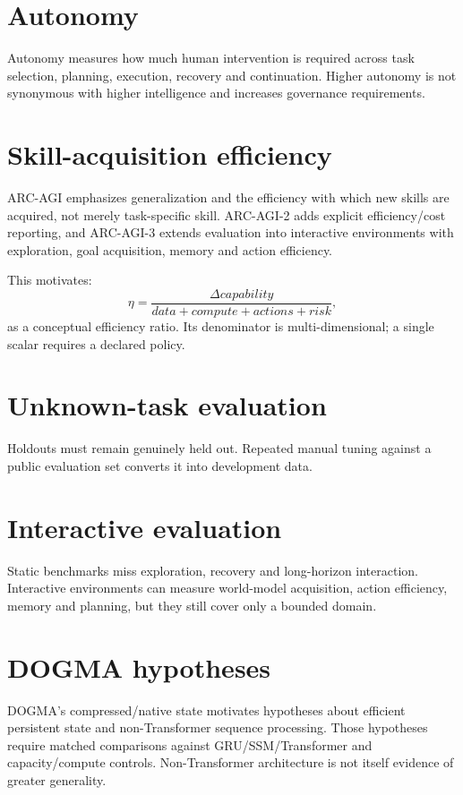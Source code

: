 \section{Autonomy}
Autonomy measures how much human intervention is required across task selection, planning, execution, recovery and continuation. Higher autonomy is not synonymous with higher intelligence and increases governance requirements.

\section{Skill-acquisition efficiency}
ARC-AGI emphasizes generalization and the efficiency with which new skills are acquired, not merely task-specific skill. ARC-AGI-2 adds explicit efficiency/cost reporting, and ARC-AGI-3 extends evaluation into interactive environments with exploration, goal acquisition, memory and action efficiency.

This motivates:
\[
\eta=\frac{\Delta capability}{data+compute+actions+risk},
\]
as a conceptual efficiency ratio. Its denominator is multi-dimensional; a single scalar requires a declared policy.

\section{Unknown-task evaluation}
Holdouts must remain genuinely held out. Repeated manual tuning against a public evaluation set converts it into development data.

\section{Interactive evaluation}
Static benchmarks miss exploration, recovery and long-horizon interaction. Interactive environments can measure world-model acquisition, action efficiency, memory and planning, but they still cover only a bounded domain.

\section{DOGMA hypotheses}
DOGMA's compressed/native state motivates hypotheses about efficient persistent state and non-Transformer sequence processing. Those hypotheses require matched comparisons against GRU/SSM/Transformer and capacity/compute controls. Non-Transformer architecture is not itself evidence of greater generality.

